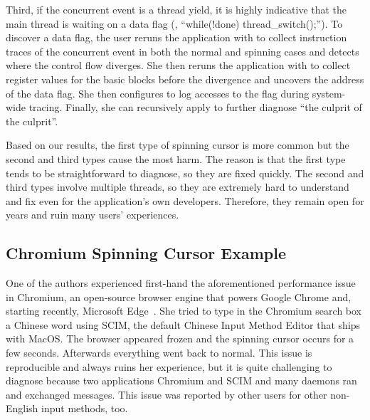 Third, if the concurrent event is a thread yield, it is highly indicative that
the main thread is waiting on a data flag (\eg, ``while(!done)
thread\_switch();'').  To discover a data flag, the user reruns the application
with \xxx to collect instruction traces of the concurrent event in both the
normal and spinning cases and detects where the control flow diverges.  She
then reruns the application with \xxx to collect register values for the basic
blocks before the divergence and uncovers the address of the data flag.  She
then configures \xxx to log accesses to the flag during system-wide tracing.
Finally, she can recursively apply \xxx to further diagnose ``the culprit of
the culprit''. 

Based on our results, the first type of spinning cursor is more common but the
second and third types cause the most harm.  The reason is that the first type
tends to be straightforward to diagnose, so they are fixed quickly.  The second
and third types involve multiple threads, so they are extremely hard to
understand and fix even for the application's own developers.  Therefore, they
remain open for years and ruin many users' experiences.

\subsection{Chromium Spinning Cursor Example}


One of the authors experienced first-hand the aforementioned performance issue
in Chromium, an open-source browser engine that powers Google Chrome and,
starting recently, Microsoft Edge~\cite{chromiumurl}.  She tried to type in the
Chromium search box a Chinese word using SCIM, the default Chinese Input Method
Editor that ships with MacOS.  The browser appeared frozen and the spinning
cursor occurs for a few seconds.  Afterwards everything went back to normal.
This issue is reproducible and always ruins her experience, but it is quite
challenging to diagnose because two applications Chromium and SCIM and many
daemons ran and exchanged messages.  This issue was reported by other users for
other non-English input methods, too.

